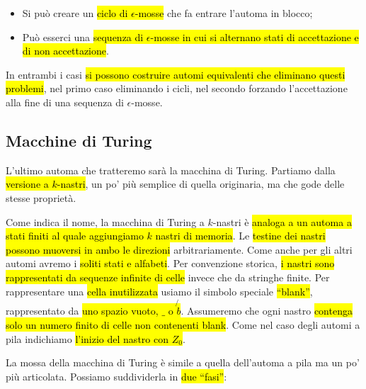 \documentclass[a4paper,11pt,oneside]{article}
\theoremstyle{plain}
\theoremstyle{definition}
\theoremstyle{remark}
\begin{document}
\begin{itemize}
  \item Si può creare un \hl{ciclo di $\epsilon$-mosse} che fa entrare l'automa
    in blocco;
  \item Può esserci una \hl{sequenza di $\epsilon$-mosse in cui si alternano
    stati di accettazione e di non accettazione}.
\end{itemize}

In entrambi i casi \hl{si possono costruire automi equivalenti che eliminano
questi problemi}, nel primo caso eliminando i cicli, nel secondo forzando
l'accettazione alla fine di una sequenza di $\epsilon$-mosse.

\subsection{Macchine di Turing}\label{sec:macchine-turing}

L'ultimo automa che tratteremo sarà la macchina di Turing. Partiamo dalla
\hl{versione a $k$-nastri}, un po' più semplice di quella originaria, ma che
gode delle stesse proprietà.

Come indica il nome, la macchina di Turing a $k$-nastri è \hl{analoga a un
automa a stati finiti al quale aggiungiamo $k$ nastri di memoria}. Le
\hl{testine dei nastri possono muoversi in ambo le direzioni} arbitrariamente.
Come anche per gli altri automi avremo i \hl{soliti stati e alfabeti}. Per
convenzione storica, \hl{i nastri sono rappresentati da sequenze infinite di
celle} invece che da stringhe finite. Per rappresentare una \hl{cella
inutilizzata} usiamo il simbolo speciale \hl{``blank''}, rappresentato da
\hl{uno spazio vuoto, $\_$ o $\not{b}$}. Assumeremo che ogni nastro \hl{contenga
solo un numero finito di celle non contenenti blank}. Come nel caso degli automi
a pila indichiamo \hl{l'inizio del nastro con $Z_0$}.

La mossa della macchina di Turing è simile a quella dell'automa a pila ma un po'
più articolata. Possiamo suddividerla in \hl{due ``fasi''}:
\end{document}

